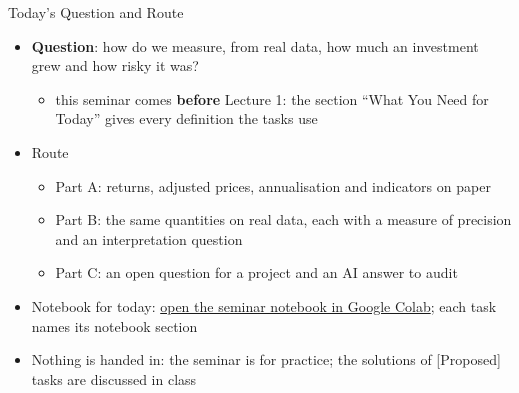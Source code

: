 \begin{frame}{Today's Question and Route}
\itemsize{\small}
\begin{itemize}
    \item \textbf{Question}: how do we measure, from real data, how much an investment grew and how risky it was?
    \begin{itemize}
        \item this seminar comes \textbf{before} Lecture 1: the section ``What You Need for Today'' gives every definition the tasks use
    \end{itemize}
    \item Route
    \begin{itemize}
        \item Part A: returns, adjusted prices, annualisation and indicators on paper
        \item Part B: the same quantities on real data, each with a measure of precision and an interpretation question
        \item Part C: an open question for a project and an AI answer to audit
    \end{itemize}
    \item Notebook for today: \href{\nb}{open the seminar notebook in Google Colab}; each task names its notebook section
    \item Nothing is handed in: the seminar is for practice; the solutions of [Proposed] tasks are discussed in class
\end{itemize}
\end{frame}

